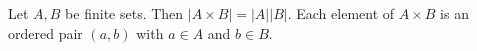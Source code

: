 Let $A, B$ be finite sets.
Then $\lvert A \times B \rvert = \lvert A \rvert \lvert B \rvert$.
Each element of $A \times B$ is an ordered pair $(a, b)$ with $a \in A$ and $b \in B$.